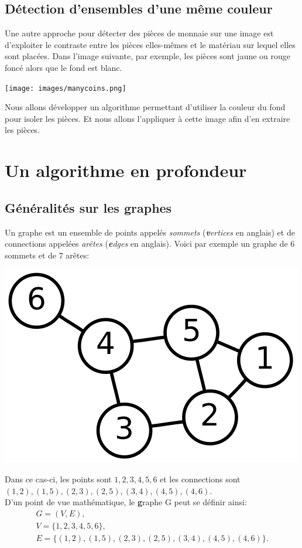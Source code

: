 \documentclass{article}
\begin{document}
\subsection{Détection d'ensembles d'une même couleur} %
Une autre approche pour détecter des pièces de monnaie sur une image est d'exploiter le contraste entre les pièces elles-mêmes et le matériau sur lequel elles sont placées. Dans l'image suivante, par exemple, les pièces sont jaune ou rouge foncé alors que le fond est blanc.

\begin{center}
\texttt{[image: images/manycoins.png]}
\end{center}

Nous allons développer un algorithme permettant d'utiliser la couleur du fond pour isoler les pièces. Et nous allons l'appliquer à cette image afin d'en extraire les pièces.

\section{Un algorithme en profondeur}
\subsection{Généralités sur les graphes}

Un graphe est un ensemble de points appelés \textit{sommets} (\textit{\textbf{v}ertices} en anglais) et de connections appelées \textit{arêtes} (\textit{\textbf{e}dges} en anglais). Voici par exemple un graphe de $6$ sommets et de $7$ arêtes:

\begin{center}
\includegraphics[width=0.5\linewidth]{images/graph.png}
\end{center}

Dans ce cas-ci, les points sont $1, 2, 3, 4, 5, 6$ et les connections sont \\ $(1,2),(1,5),(2,3),(2,5),(3,4),(4,5),(4,6)$. \\
D'un point de vue mathématique, le \textbf{g}raphe G peut se définir ainsi: 
$$\begin{array}{l}
G = (V, E), \\
V = \{1,2,3,4,5,6\}, \\
E = \{(1,2),(1,5),(2,3),(2,5),(3,4),(4,5),(4,6)\}.
\end{array}$$
\end{document}
